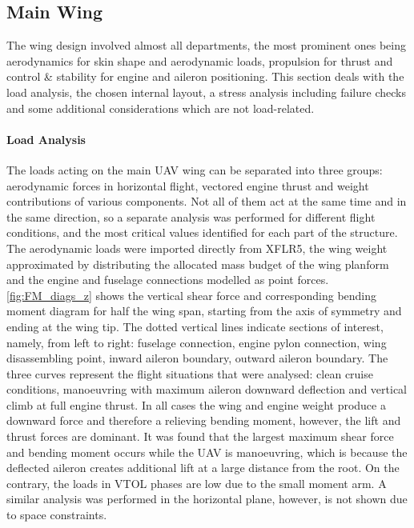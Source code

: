 \subsection{Main Wing}

The wing design involved almost all departments, the most prominent ones being aerodynamics for skin shape and aerodynamic loads, propulsion for thrust and control \& stability for engine and aileron positioning. This section deals with the load analysis, the chosen internal layout, a stress analysis including failure checks and some additional considerations which are not load-related.    

\paragraph{Load Analysis}

The loads acting on the main UAV wing can be separated into three groups: aerodynamic forces in horizontal flight, vectored engine thrust and weight contributions of various components. Not all of them act at the same time and in the same direction, so a separate analysis was performed for different flight conditions, and the most critical values identified for each part of the structure. The aerodynamic loads were imported directly from XFLR5, the wing weight approximated by distributing the allocated mass budget of the wing planform and the engine and fuselage connections modelled as point forces.   
\autoref{fig:FM_diags_z} shows the vertical shear force and corresponding bending moment diagram for half the wing span, starting from the axis of symmetry and ending at the wing tip. The dotted vertical lines indicate sections of interest, namely, from left to right: fuselage connection, engine pylon connection, wing disassembling point, inward aileron boundary, outward aileron boundary. The three curves represent the flight situations that were analysed: clean cruise conditions, manoeuvring with maximum aileron downward deflection and vertical climb at full engine thrust. In all cases the wing and engine weight produce a downward force and therefore a relieving bending moment, however, the lift and thrust forces are dominant. It was found that the largest maximum shear force and bending moment occurs while the UAV is manoeuvring, which is because the deflected aileron creates additional lift at a large distance from the root. On the contrary, the loads in VTOL phases are low due to the small moment arm. A similar analysis was performed in the horizontal plane, however, is not shown due to space constraints. %


